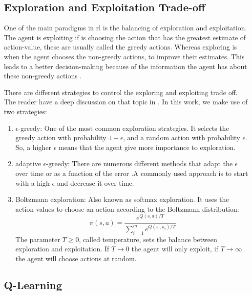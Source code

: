 \subsection{Exploration and Exploitation Trade-off}

One of the main paradigms in \gls{rl} is the balancing of exploration and exploitation.
%
The agent is exploiting if is choosing the action that has the greatest estimate of action-value, these are usually called the greedy actions.
%
Whereas exploring is when the agent chooses the non-greedy actions, to improve their estimates.
%
This leads to a better decision-making because of the information the agent has about these non-greedy actions \cite{sutton2018rl}.
%


There are different strategies to control the exploring and exploiting trade off. The reader have a deep discussion on that topic in \cite{exploration2016}.
%
In this work, we make use of two strategies:
\begin{enumerate}
  \item $\epsilon$-greedy: One of the most common exploration strategies. It selects the greedy action with probability $1-\epsilon$, and a random action with probability $\epsilon$. So, a higher $\epsilon$ means that the agent give more importance to exploration.
  \item adaptive $\epsilon$-greedy: There are numerous different methods that adapt the $\epsilon$ over time or as a function of the error \cite{improvingBandits}.A commonly used approach is to start with a high $\epsilon$ and decrease it over time.
  \item Boltzmann exploration: Also known as softmax exploration. It uses the action-values to choose an action according to the Boltzmann distribution:
  $$
\pi\left(s, a\right)=\frac{e^{Q\left(s, a\right) / T}}{\sum_{i=1}^{m} e^{Q\left(s^{\prime}, a_i\right) / T}}
  $$
  The parameter $T \geq 0$, called temperature, sets the balance between exploration and exploitation. If $T \rightarrow 0$  the agent will only exploit, if $T \rightarrow \infty$ the agent will choose actions at random.
\end{enumerate}


\subsection{Q-Learning}

